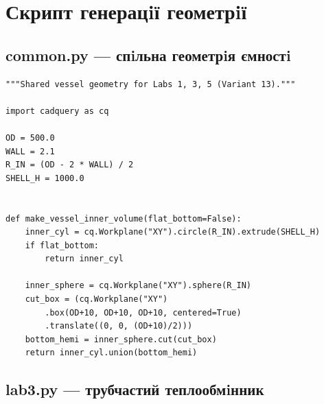 \appendix
\section{Скрипт генерацiї геометрiї}

\subsection{common.py --- спiльна геометрiя ємностi}

\begin{lstlisting}[style=python]
"""Shared vessel geometry for Labs 1, 3, 5 (Variant 13)."""

import cadquery as cq

OD = 500.0
WALL = 2.1
R_IN = (OD - 2 * WALL) / 2
SHELL_H = 1000.0


def make_vessel_inner_volume(flat_bottom=False):
    inner_cyl = cq.Workplane("XY").circle(R_IN).extrude(SHELL_H)
    if flat_bottom:
        return inner_cyl

    inner_sphere = cq.Workplane("XY").sphere(R_IN)
    cut_box = (cq.Workplane("XY")
        .box(OD+10, OD+10, OD+10, centered=True)
        .translate((0, 0, (OD+10)/2)))
    bottom_hemi = inner_sphere.cut(cut_box)
    return inner_cyl.union(bottom_hemi)
\end{lstlisting}

\subsection{lab3.py --- трубчастий теплообмiнник}

